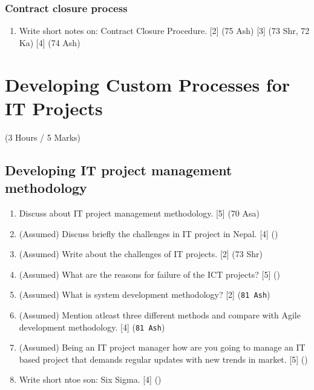 \documentclass[12pt]{article}
\begin{document}
    \subsubsection{Contract closure process}
      \begin{enumerate}
        \item Write short notes on: Contract Closure Procedure. \hfill [2] (75 Ash) [3] (73 Shr, 72 Ka) [4] (74 Ash)
      \end{enumerate}
  
\pagebreak

\section{Developing Custom Processes for IT Projects}
  \begin{center}(3 Hours / 5 Marks)\end{center}

  \subsection{Developing IT project management methodology}
    \begin{enumerate}
      \item Discuss about IT project management methodology. \hfill [5] (70 Asa)
        
      \item (Assumed) Discuss briefly the challenges in IT project in Nepal. \hfill [4] ()

      \item (Assumed) Write about the challenges of IT projects. \hfill [2] (73 Shr)

      \item (Assumed) What are the reasons for failure of the ICT projects? \hfill [5] ()

      \item (Assumed) What is system development methodology? \hfill [2] (\texttt{81 Ash})

      \item (Assumed) Mention atleast three different methods and compare with Agile development methodology. \hfill [4] (\texttt{81 Ash})

      \item (Assumed) Being an IT project manager how are you going to manage an IT based project that demands regular updates with new trends in market. \hfill [5] ()

      \item Write short ntoe son: Six Sigma. \hfill [4] ()
    \end{enumerate}
\end{document}

